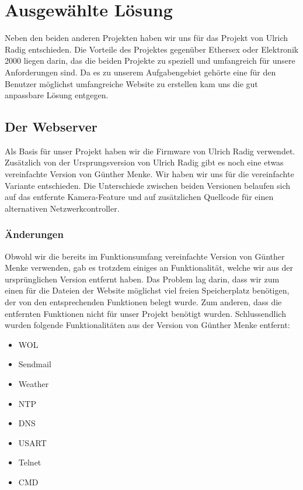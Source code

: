 \chapter{Ausgewählte Lösung}

Neben den beiden anderen Projekten haben wir uns für das Projekt von Ulrich
Radig entschieden. Die Vorteile des Projektes gegenüber Ethersex oder Elektronik
2000 liegen darin, das die beiden Projekte zu speziell und umfangreich für unsere
Anforderungen sind. Da es zu unserem Aufgabengebiet gehörte eine für den
Benutzer möglichst umfangreiche Website zu erstellen kam uns die gut anpassbare
Lösung entgegen.

\section{Der Webserver}

Als Basis für unser Projekt haben wir die Firmware von Ulrich Radig verwendet.
Zusätzlich von der Ursprungsversion von Ulrich Radig gibt es noch eine etwas
vereinfachte Version von Günther Menke. Wir haben wir uns für die vereinfachte
Variante entschieden. Die Unterschiede zwischen beiden
Versionen belaufen sich auf das entfernte Kamera-Feature und auf
zusätzlichen Quellcode für einen alternativen Netzwerkcontroller.

\subsection{Änderungen}

Obwohl wir die bereits im Funktionsumfang vereinfachte Version
von Günther Menke verwenden, gab es trotzdem einiges an Funktionalität, welche wir
aus der ursprünglichen Version entfernt haben.
Das Problem lag darin, dass wir zum einen für die Dateien der Website möglichst
viel freien Speicherplatz benötigen, der von den entsprechenden Funktionen
belegt wurde. Zum anderen, dass die entfernten Funktionen nicht für unser
Projekt benötigt wurden. Schlussendlich wurden folgende Funktionalitäten aus der Version
von Günther Menke entfernt:

\begin{itemize}
  \item \ac{WOL}
  \item Sendmail
  \item Weather
  \item \ac{NTP}
  \item \ac{DNS}
  \item \ac{USART}
  \item \ac{Telnet}
  \item \ac{CMD}
\end{itemize}

